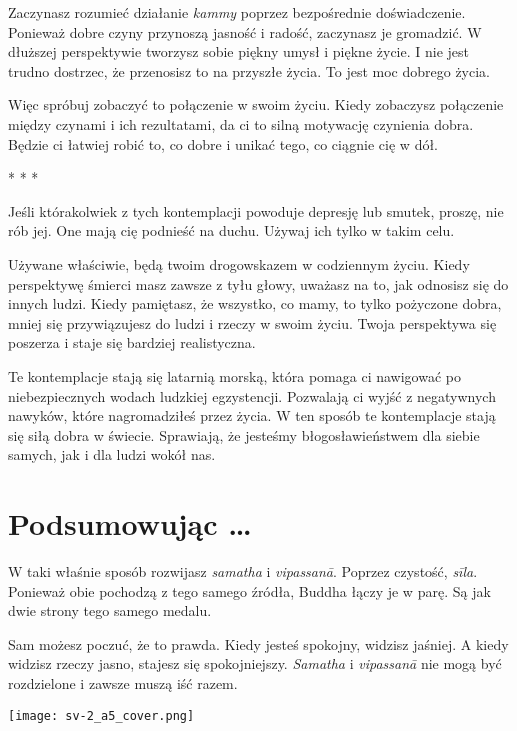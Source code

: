 \documentclass[12pt,openany]{book}
\begin{document}
Zaczynasz rozumieć działanie \textit{kammy} poprzez bezpośrednie doświadczenie. Ponieważ dobre czyny przynoszą jasność i radość, zaczynasz je gromadzić. W dłuższej perspektywie tworzysz sobie piękny umysł i piękne życie. I nie jest trudno dostrzec, że przenosisz to na przyszłe życia. To jest moc dobrego życia.

Więc spróbuj zobaczyć to połączenie w swoim życiu. Kiedy zobaczysz połączenie między czynami i ich rezultatami, da ci to silną motywację czynienia dobra. Będzie ci łatwiej robić to, co dobre i unikać tego, co ciągnie cię w dół.

\begin{center}
* * *
\end{center}

Jeśli którakolwiek z tych kontemplacji powoduje depresję lub smutek, proszę, nie rób jej. One mają cię podnieść na duchu. Używaj ich tylko w takim celu.

Używane właściwie, będą twoim drogowskazem w codziennym życiu. Kiedy perspektywę śmierci masz zawsze z tyłu głowy, uważasz na to, jak odnosisz się do innych ludzi. Kiedy pamiętasz, że wszystko, co mamy, to tylko pożyczone dobra, mniej się przywiązujesz do ludzi i rzeczy w swoim życiu. Twoja perspektywa się poszerza i staje się bardziej realistyczna.

Te kontemplacje stają się latarnią morską, która pomaga ci nawigować po niebezpiecznych wodach ludzkiej egzystencji. Pozwalają ci wyjść z negatywnych nawyków, które nagromadziłeś przez życia. W ten sposób te kontemplacje stają się siłą dobra w świecie. Sprawiają, że jesteśmy błogosławieństwem dla siebie samych, jak i dla ludzi wokół nas.

\chapter*{Podsumowując …}

W taki właśnie sposób rozwijasz \textit{samatha} i \textit{vipassanā}. Poprzez czystość, \textit{sīla}. Ponieważ obie pochodzą z tego samego źródła, Buddha łączy je w parę. Są jak dwie strony tego samego medalu.

Sam możesz poczuć, że to prawda. Kiedy jesteś spokojny, widzisz jaśniej. A kiedy widzisz rzeczy jasno, stajesz się spokojniejszy. \textit{Samatha} i \textit{vipassanā} nie mogą być rozdzielone i zawsze muszą iść razem.



\hspace*{-7mm}
\texttt{[image: sv-2\_a5\_cover.png]}
\end{document}
